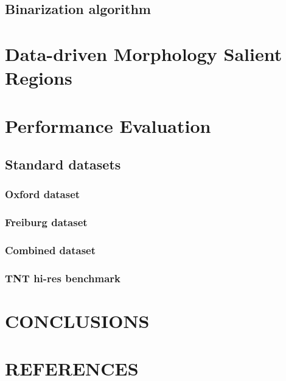 \documentclass{article}
\begin{document}
\subsection{Binarization algorithm}
\label{ssec:binarize}


\section{Data-driven Morphology Salient Regions}
\label{sec:DMSR}


\section{Performance  Evaluation}
\label{sec:perf}

\subsection{Standard datasets}
\label{ssec:standart}

\subsubsection{Oxford dataset}
\label{sssec:oxford}
\subsubsection{Freiburg dataset}
\label{sssec:freiburg}
\subsubsection{Combined dataset}
\label{sssec:combined}
\subsubsection{TNT hi-res benchmark}
\label{sssec:tnt}

\section{CONCLUSIONS}
\label{sec:concl}






\section{REFERENCES}
\label{sec:ref}




\end{document}
